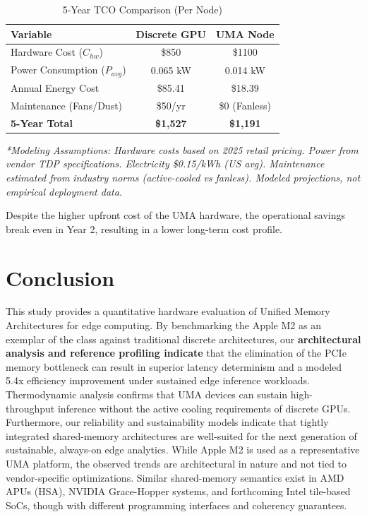 \documentclass[conference]{IEEEtran}
\begin{document}
\begin{table}[htbp]
\caption{5-Year TCO Comparison (Per Node)}
\begin{center}
\begin{tabular}{lcc}
\toprule
\textbf{Variable} & \textbf{Discrete GPU} & \textbf{UMA Node} \\
\midrule
Hardware Cost ($C_{hw}$) & \$850 & \$1100 \\
Power Consumption ($P_{avg}$) & 0.065 kW & 0.014 kW \\
Annual Energy Cost & \$85.41 & \$18.39 \\
Maintenance (Fans/Dust) & \$50/yr & \$0 (Fanless) \\
\textbf{5-Year Total} & \textbf{\$1,527} & \textbf{\$1,191} \\
\bottomrule
\end{tabular}
\end{center}
\textit{*Modeling Assumptions: Hardware costs based on 2025 retail pricing. Power from vendor TDP specifications. Electricity \$0.15/kWh (US avg). Maintenance estimated from industry norms (active-cooled vs fanless). Modeled projections, not empirical deployment data.}
\label{tab:tco}
\end{table}

Despite the higher upfront cost of the UMA hardware, the operational savings break even in Year 2, resulting in a lower long-term cost profile.

\section{Conclusion}
This study provides a quantitative hardware evaluation of Unified Memory Architectures for edge computing. By benchmarking the Apple M2 as an exemplar of the class against traditional discrete architectures, our \textbf{architectural analysis and reference profiling indicate} that the elimination of the PCIe memory bottleneck can result in superior latency determinism and a modeled 5.4x efficiency improvement under sustained edge inference workloads. Thermodynamic analysis confirms that UMA devices can sustain high-throughput inference without the active cooling requirements of discrete GPUs. Furthermore, our reliability and sustainability models indicate that tightly integrated shared-memory architectures are well-suited for the next generation of sustainable, always-on edge analytics. While Apple M2 is used as a representative UMA platform, the observed trends are architectural in nature and not tied to vendor-specific optimizations. Similar shared-memory semantics exist in AMD APUs (HSA), NVIDIA Grace-Hopper systems, and forthcoming Intel tile-based SoCs, though with different programming interfaces and coherency guarantees.
\end{document}
